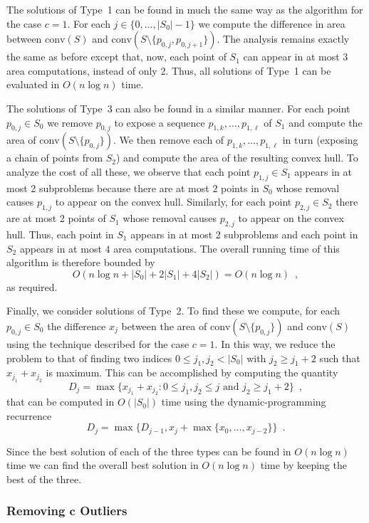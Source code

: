 \documentclass{elsart}
\newcommand{\ch}{\mathrm{conv}}
\begin{document}
The solutions of Type~1 can be found in much the same way as the
algorithm for the case $c=1$.  For each $j\in\{0,\ldots,|S_0|-1\}$ we
compute the difference in area between $\ch(S)$ and
$\ch(S\setminus\{p_{0,j},p_{0,j+1}\})$.  The analysis remains exactly
the same as before except that, now, each point of $S_1$ can appear in
at most $3$ area computations, instead of only 2.  Thus, all solutions
of Type~1 can be evaluated in $O(n\log n)$ time.

The solutions of Type~3 can also be found in a similar manner.  For
each point $p_{0,j}\in S_0$ we remove $p_{0,j}$ to expose a sequence
$p_{1,k},\ldots,p_{1,\ell}$ of $S_1$ and compute the area of
$\ch(S\setminus\{p_{0,j}\})$.  We then remove each of
$p_{1,k},\ldots,p_{1,\ell}$ in turn (exposing a chain of points from
$S_2$) and compute the area of the resulting convex hull.  To analyze
the cost of all these, we observe that each point $p_{1,j}\in S_1$
appears in at most 2 subproblems because there are at most 2 points in
$S_0$ whose removal causes $p_{1,j}$ to appear on the convex hull.
Similarly, for each point $p_{2,j}\in S_2$ there are at most 2 points
of $S_1$ whose removal causes $p_{2,j}$ to appear on the convex hull.
Thus, each point in $S_1$ appears in at most 2 subproblems and each
point in $S_2$ appears in at most $4$ area computations.  The overall
running time of this algorithm is therefore bounded by
\[
    O\left(n\log n + |S_0| + 2|S_1| + 4|S_2|\right) = O(n\log n) \enspace ,
\]
as required.

Finally, we consider solutions of Type~2.  To find these we compute,
for each $p_{0,j}\in S_0$ the difference $x_j$ between the area of
$\ch(S\setminus\{p_{0,j}\})$ and $\ch(S)$ using the technique
described for the case $c=1$.  In this way, we reduce the problem to
that of finding two indices $0\le j_1,j_2< |S_0|$ with $j_2\ge j_1+2$
such that $x_{j_1}+x_{j_2}$ is maximum.  This can be accomplished by
computing the quantity
\[
     D_j = \max\{x_{j_1}+x_{j_2} :
       \mbox{$0\le j_1,j_2\le j$ and $j_2 \ge j_1+2$}\} \enspace ,
\]
that can be computed in $O(|S_0|)$ time using the dynamic-programming 
recurrence
\[
    D_j = \max\{D_{j-1}, x_{j} + \max\{x_{0},\ldots,x_{j-2}\}\}
                \enspace .
\]

Since the best solution of each of the three types can be found in
$O(n\log n)$ time we can find the overall best solution in $O(n\log
n)$ time by keeping the best of the three.

\subsubsection{Removing $\mathbf{c}$ Outliers}
\end{document}
